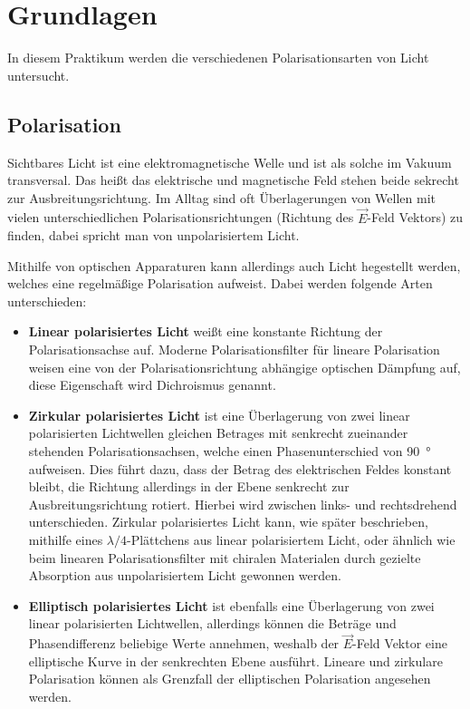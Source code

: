 \chapter{Grundlagen}

In diesem Praktikum werden die verschiedenen Polarisationsarten von Licht untersucht.

\section{Polarisation}

Sichtbares Licht ist eine elektromagnetische Welle und ist als solche im Vakuum transversal.
Das heißt das elektrische und magnetische Feld stehen beide sekrecht zur Ausbreitungsrichtung.
Im Alltag sind oft Überlagerungen von Wellen mit vielen unterschiedlichen Polarisationsrichtungen (Richtung des $\vec{E}$-Feld Vektors) zu finden, dabei spricht man von unpolarisiertem Licht.

Mithilfe von optischen Apparaturen kann allerdings auch Licht hegestellt werden, welches eine regelmäßige Polarisation aufweist.
Dabei werden folgende Arten unterschieden:

\begin{itemize}
	\item \textbf{Linear polarisiertes Licht} weißt eine konstante Richtung der Polarisationsachse auf.
	Moderne Polarisationsfilter für lineare Polarisation weisen eine von der Polarisationsrichtung abhängige optischen Dämpfung auf, diese Eigenschaft wird Dichroismus genannt.
	\item \textbf{Zirkular polarisiertes Licht} ist eine Überlagerung von zwei linear polarisierten Lichtwellen gleichen Betrages mit senkrecht zueinander stehenden Polarisationsachsen, welche einen Phasenunterschied von \SI{90}{\degree} aufweisen.
	Dies führt dazu, dass der Betrag des elektrischen Feldes konstant bleibt, die Richtung allerdings in der Ebene senkrecht zur Ausbreitungsrichtung rotiert.
	Hierbei wird zwischen links- und rechtsdrehend unterschieden.
	Zirkular polarisiertes Licht kann, wie später beschrieben, mithilfe eines $\lambda / 4$-Plättchens aus linear polarisiertem Licht, oder ähnlich wie beim linearen Polarisationsfilter mit chiralen Materialen durch gezielte Absorption aus unpolarisiertem Licht gewonnen werden.
	\item \textbf{Elliptisch polarisiertes Licht} ist ebenfalls eine Überlagerung von zwei linear polarisierten Lichtwellen, allerdings können die Beträge und Phasendifferenz beliebige Werte annehmen, weshalb der $\vec{E}$-Feld Vektor eine elliptische Kurve in der senkrechten Ebene ausführt.
	Lineare und zirkulare Polarisation können als Grenzfall der elliptischen Polarisation angesehen werden.
\end{itemize}

